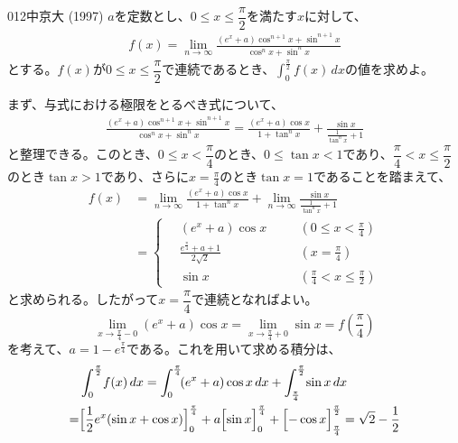 \begin{thm}{012}{}{中京大 (1997)}
 $a$を定数とし、$0\le x \le \dfrac{\pi}{2}$を満たす$x$に対して、
 \begin{align*}
  f(x)=\lim_{n\rightarrow\infty}\frac{(e^x+a)\cos^{n+1}x+\sin^{n+1}x}{\cos^nx+\sin^nx}
 \end{align*}
 とする。$f(x)$が$0\le x \le \dfrac{\pi}{2}$で連続であるとき、$\displaystyle \int^{\frac{\pi}{2}}_0\!\! f(x) \,dx$の値を求めよ。
\end{thm}

まず、与式における極限をとるべき式について、
\begin{align*}
 \frac{(e^x+a)\cos^{n+1}x+\sin^{n+1}x}{\cos^nx+\sin^nx}=\frac{(e^x+a)\cos x}{1+\tan^n x}+\frac{\sin x}{\frac{1}{\tan^n x}+1}
\end{align*}
と整理できる。このとき、$0\le x<\dfrac{\pi}{4}$のとき、$0\le\tan x<1$であり、$\dfrac{\pi}{4}<x\le\dfrac{\pi}{2}$のとき$\tan x>1$であり、さらに$x=\frac{\pi}{4}$のとき$\tan x=1$であることを踏まえて、
\begin{align*}
 f(x)&=\lim_{n\to\infty} \frac{(e^x+a)\cos x}{1+\tan^n x}+ \lim_{n\to\infty} \frac{\sin x}{\frac{1}{\tan^n x}+1} \\
 &=\left\{\,
 \begin{alignedat}{2}
  &(e^x+a)\cos x & &\left(0\le x<\frac{\pi}{4}\right) \\
  &\frac{e^\frac{\pi}{4}+a+1}{2\sqrt{2}} & \quad &\left(x=\frac{\pi}{4}\right) \\
  &\sin x & &\left(\frac{\pi}{4}<x\le\frac{\pi}{2}\right)
 \end{alignedat} \right.
\end{align*}
と求められる。したがって$x=\dfrac{\pi}{4}$で連続となればよい。
\[ \lim_{x\to\frac{\pi}{4}-0} (e^x+a)\cos x = \lim_{x\to\frac{\pi}{4}+0} \sin x = f\left(\frac{\pi}{4}\right) \]
を考えて、$a=1-e^\frac{\pi}{4}$である。これを用いて求める積分は、
\begin{align*}
 &\int_0^{\frac{\pi}{2}}\! f(x) \,dx = \int_0^{\frac{\pi}{4}}\! (e^x+a)\cos x \,dx + \int_{\frac{\pi}{4}}^{\frac{\pi}{2}}\! \sin x \,dx \\
 =& \Bigl[\frac{1}{2}e^x(\sin x+\cos x)\Bigr]_0^{\frac{\pi}{4}}+a\Bigl[\sin x \Bigr]_0^{\frac{\pi}{4}}+\Bigl[-\cos x\Bigr]_{\frac{\pi}{4}}^{\frac{\pi}{2}} = \sqrt{2}-\frac{1}{2}
\end{align*}



